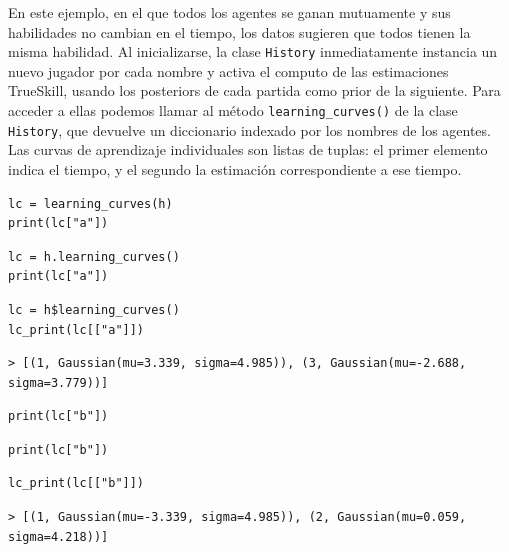 \documentclass[a4paper,11pt]{book}
\theoremstyle{definition}
\begin{document}
En este ejemplo, en el que todos los agentes se ganan mutuamente y sus habilidades no cambian en el tiempo, los datos sugieren que todos tienen la misma habilidad.
%
Al inicializarse, la clase \texttt{History} inmediatamente instancia un nuevo jugador por cada nombre y activa el computo de las estimaciones TrueSkill, usando los posteriors de cada partida como prior de la siguiente.
%
Para acceder a ellas podemos llamar al m\'etodo \texttt{learning\_curves()} de la clase \texttt{History}, que devuelve un diccionario indexado por los nombres de los agentes.
%
Las curvas de aprendizaje individuales son listas de tuplas: el primer elemento indica el tiempo, y el segundo la estimaci\'on correspondiente a ese tiempo.
%
\begin{paracol}{3}
\begin{lstlisting}[backgroundcolor=\color{julia!60}, belowskip=-0.77 \baselineskip]
lc = learning_curves(h)
print(lc["a"])
\end{lstlisting}
  \switchcolumn
\begin{lstlisting}[backgroundcolor=\color{python!60}, belowskip=-0.77 \baselineskip]
lc = h.learning_curves()
print(lc["a"])
\end{lstlisting}
   \switchcolumn
\begin{lstlisting}[backgroundcolor=\color{r!50}, belowskip=-0.77 \baselineskip]
lc = h$learning_curves()
lc_print(lc[["a"]])
\end{lstlisting}
\end{paracol}
\begin{lstlisting}[backgroundcolor=\color{all}, belowskip=-0.77 \baselineskip]
> [(1, Gaussian(mu=3.339, sigma=4.985)), (3, Gaussian(mu=-2.688, sigma=3.779))]
\end{lstlisting}
\begin{paracol}{3}
\begin{lstlisting}[backgroundcolor=\color{julia!60}, belowskip=-0.77 \baselineskip]
print(lc["b"])
\end{lstlisting}
  \switchcolumn
\begin{lstlisting}[backgroundcolor=\color{python!60}, belowskip=-0.77 \baselineskip]
print(lc["b"])
\end{lstlisting}
   \switchcolumn
\begin{lstlisting}[backgroundcolor=\color{r!50}, belowskip=-0.77 \baselineskip]
lc_print(lc[["b"]])
\end{lstlisting}
\end{paracol}
\begin{lstlisting}[captionpos=b,backgroundcolor=\color{all},label=lst:trueskill, caption={Curvas de aprendizaje de los jugadores que participan en una secuencia de eventos},belowskip=0cm]
> [(1, Gaussian(mu=-3.339, sigma=4.985)), (2, Gaussian(mu=0.059, sigma=4.218))]
\end{lstlisting}
\end{document}
